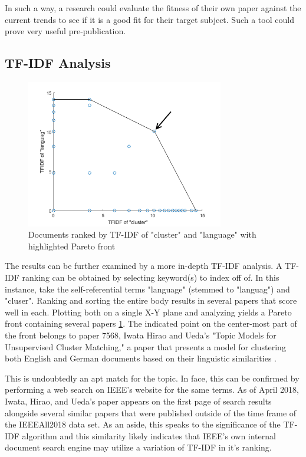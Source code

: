 \documentclass[conference]{IEEEtran}
\begin{document}
In such a way, a research could evaluate the fitness of their own paper against the current trends to see if it is a good fit for their target subject. Such a tool could prove very useful pre-publication.

\subsection{TF-IDF Analysis}

\begin{figure}
	\centering
	\includegraphics[width=3.4in]{tfidf-pareto.png}
	\caption{Documents ranked by TF-IDF of "cluster" and "language" with highlighted Pareto front}
	\label{fig:tfidf_pareto}
\end{figure}

The results can be further examined by a more in-depth TF-IDF analysis. A TF-IDF ranking can be obtained by selecting keyword(s) to index off of. In this instance, take the self-referential terms "language" (stemmed to "languag") and "cluser". Ranking and sorting the entire body results in several papers that score well in each. Plotting both on a single X-Y plane and analyzing yields a Pareto front containing several papers \ref{fig:tfidf_pareto}. The indicated point on the center-most part of the front belongs to paper 7568, Iwata Hirao and Ueda's "Topic Models for Unsupervised Cluster Matching," a paper that presents a model for clustering both English and German documents based on their linguistic similarities \cite{8125189}.

This is undoubtedly an apt match for the topic. In face, this can be confirmed by performing a web search on IEEE's website for the same terms. As of April 2018, Iwata, Hirao, and Ueda's paper appears on the first page of search results alongside several similar papers that were published outside of the time frame of the IEEEAll2018 data set. As an aside, this speaks to the significance of the TF-IDF algorithm and this similarity likely indicates that IEEE's own internal document search engine may utilize a variation of TF-IDF in it's ranking.
\end{document}
